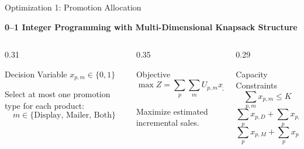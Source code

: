\documentclass[aspectratio=169,10pt]{beamer}
\begin{document}
\begin{frame}{Optimization 1: Promotion Allocation}
\vspace{0.05cm}
\begin{center}\color{Blue}\textbf{0--1 Integer Programming with Multi-Dimensional Knapsack Structure}\end{center}
\vspace{0.2cm}
\begin{columns}[T]
\begin{column}{0.31\textwidth}
\begin{block}{Decision Variable}
\centering
$ x_{p,m}\in\{0,1\} $
\vspace{1mm}
\raggedright
Select at most one promotion type for each product:
\[
m\in\{\text{Display, Mailer, Both}\}
\]
\end{block}
\end{column}
\begin{column}{0.35\textwidth}
\begin{block}{Objective}
\centering
\[
\boxed{\displaystyle
\max Z=\sum_p\sum_m U_{p,m}x_{p,m}}
\]
\vspace{-1mm}
\raggedright
Maximize estimated incremental sales.
\end{block}
\end{column}
\begin{column}{0.29\textwidth}
\begin{block}{Capacity Constraints}
\[
\sum_{p,m}x_{p,m}\le K
\]
\[
\sum_p x_{p,D}+\sum_p x_{p,B}\le D_{\max}
\]
\[
\sum_p x_{p,M}+\sum_p x_{p,B}\le M_{\max}
\]
\end{block}
\end{column}
\end{columns}
\vspace{0.35cm}
\begin{center}
\end{center}
\end{frame}
\end{document}
